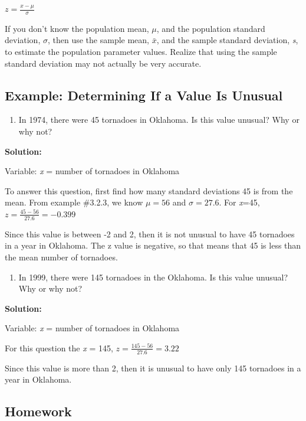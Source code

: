 \documentclass[]{book}
\providecommand{\tightlist}{%
  \setlength{\itemsep}{0pt}\setlength{\parskip}{0pt}}
\begin{document}
\(z=\frac{x-\mu}{\sigma}\)

If you don't know the population mean, \(\mu\), and the population standard
deviation, \(\sigma\), then use the sample mean, \(\bar{x}\), and the sample standard
deviation, \emph{s}, to estimate the population parameter values. Realize that using the sample standard deviation may not actually be very accurate.

\hypertarget{example-determining-if-a-value-is-unusual}{%
\subsection{Example: Determining If a Value Is Unusual}\label{example-determining-if-a-value-is-unusual}}

\begin{enumerate}
\def\labelenumi{\alph{enumi}.}
\tightlist
\item
  In 1974, there were 45 tornadoes in Oklahoma. Is this value unusual? Why or why not?
\end{enumerate}

\textbf{Solution:}

Variable: \emph{x} = number of tornadoes in Oklahoma

To answer this question, first find how many standard deviations 45 is from the mean. From example \#3.2.3, we know \(\mu=56\) and \(\sigma=27.6\). For \emph{x}=45, \(z=\frac{45-56}{27.6}=-0.399\)

Since this value is between -2 and 2, then it is not unusual to have 45 tornadoes in a year in Oklahoma. The z value is negative, so that means that 45 is less than the mean number of tornadoes.

\begin{enumerate}
\def\labelenumi{\alph{enumi}.}
\setcounter{enumi}{1}
\tightlist
\item
  In 1999, there were 145 tornadoes in the Oklahoma. Is this value unusual? Why or why not?
\end{enumerate}

\textbf{Solution:}

Variable: \emph{x} = number of tornadoes in Oklahoma

For this question the \emph{x} = 145, \(z=\frac{145-56}{27.6}=3.22\)

Since this value is more than 2, then it is unusual to have only 145 tornadoes in a year in Oklahoma.

\hypertarget{homework-8}{%
\subsection{Homework}\label{homework-8}}
\end{document}
